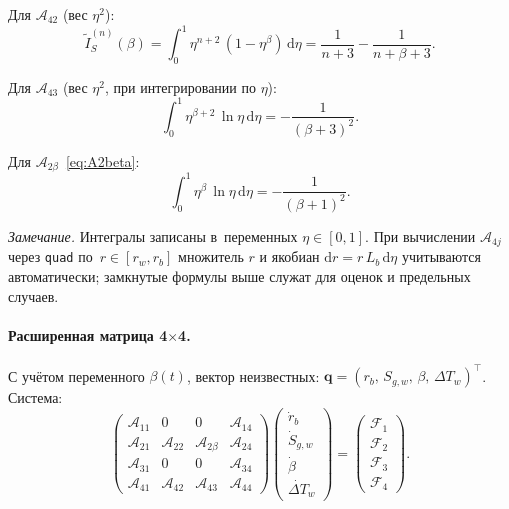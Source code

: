 \documentclass[12pt,a4paper]{article}
\newcommand{\dd}{\mathrm{d}}
\begin{document}
Для $\mathcal{A}_{42}$ (вес $\eta^2$):
\begin{equation}\label{eq:I_S_tilde}
  \widetilde{I}_S^{(n)}(\beta)
  = \int_0^1 \eta^{n+2}\,(1-\eta^\beta)\,\dd\eta
  = \frac{1}{n+3} - \frac{1}{n+\beta+3}.
\end{equation}

Для $\mathcal{A}_{43}$ (вес $\eta^2$, при интегрировании по $\eta$):
\begin{equation}\label{eq:K_S}
  \int_0^1 \eta^{\beta+2}\,\ln\eta\,\dd\eta
  = -\frac{1}{(\beta{+}3)^2}.
\end{equation}

Для $\mathcal{A}_{2\beta}$~\eqref{eq:A2beta}:
\begin{equation}\label{eq:K_A2beta}
  \int_0^1 \eta^{\beta}\,\ln\eta\,\dd\eta
  = -\frac{1}{(\beta{+}1)^2}.
\end{equation}

\emph{Замечание.} Интегралы записаны в~переменных
$\eta \in [0,1]$.
При вычислении $\mathcal{A}_{4j}$ через \texttt{quad}
по~$r \in [r_w, r_b]$ множитель $r$ и якобиан
$\dd r = r\,L_b\,\dd\eta$ учитываются автоматически;
замкнутые формулы выше служат для оценок
и предельных случаев.

\paragraph{Расширенная матрица 4$\times$4.}
С учётом переменного $\beta(t)$,
вектор неизвестных:
$\mathbf{q} = (r_b,\,S_{g,w},\,\beta,\,\Delta T_w)^\top$.
Система:
\begin{equation}\label{eq:ode_system_4x4}
  \boxed{
    \begin{pmatrix}
      \mathcal{A}_{11} & 0
        & 0 & \mathcal{A}_{14} \\
      \mathcal{A}_{21} & \mathcal{A}_{22}
        & \mathcal{A}_{2\beta} & \mathcal{A}_{24} \\
      \mathcal{A}_{31} & 0
        & 0 & \mathcal{A}_{34} \\
      \mathcal{A}_{41} & \mathcal{A}_{42}
        & \mathcal{A}_{43} & \mathcal{A}_{44}
    \end{pmatrix}
    \begin{pmatrix}
      \dot{r}_b \\ \dot{S}_{g,w} \\ \dot\beta
      \\ \dot{\Delta T}_w
    \end{pmatrix}
    =
    \begin{pmatrix}
      \mathcal{F}_1 \\ \mathcal{F}_2
      \\ \mathcal{F}_3 \\ \mathcal{F}_4
    \end{pmatrix}.
  }
\end{equation}
\end{document}
